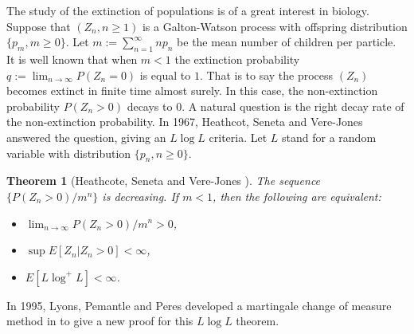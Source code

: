 \documentclass[12pt,a4paper]{amsart}
\numberwithin{equation}{section}
\theoremstyle{plain}
\newtheorem{thm}{Theorem}[section]
\theoremstyle{definition}
\theoremstyle{remark}
\begin{document}
The study of the extinction of populations is of a great interest in biology. Suppose that $(Z_n, n\ge 1)$ is a Galton-Watson process with offspring distribution $\{p_m, m\ge 0\}$.
Let $m:=\sum^{\infty}_{n=1}np_n$ be the mean number of
children per particle. It is well known that when $m<1$ the extinction probability $q:=\lim_{n\rightarrow\infty}P\left(Z_n=0\right)$ is equal to
$1$. That is to say the process $(Z_n)$ becomes extinct in finite time almost surely. In this case, the non-extinction probability $P(Z_n>0)$ decays to $0$.  A natural question is  the right decay rate of the non-extinction probability. In 1967, Heathcot, Seneta and Vere-Jones \cite{HeathcoteSenetaVere-Jones1967A-refinement} answered the question, giving an $L\log L$ criteria. Let $L$ stand for a random variable with distribution $\{p_n, n\ge 0\}$.

\begin{thm}[Heathcote, Seneta and Vere-Jones \cite{HeathcoteSenetaVere-Jones1967A-refinement}]
The sequence $\{ P(Z_n>0)/m^n\}$ is decreasing. If $m<1$, then the following are equivalent:
\begin{itemize}
\item[$(i)$] $\lim_{n\rightarrow\infty}P(Z_n>0)/m^n>0$,
\item[$(ii)$] $\sup E[Z_n|Z_n>0]<\infty$,
\item[$(iii)$] $E\left[L\log^+ L\right]<\infty$.
\end{itemize}
\end{thm}
In 1995, Lyons, Pemantle and Peres developed a martingale change of measure method in \cite{LyonsPemantlePeres1995Conceptual} to give a new proof for this $L\log L$ theorem.
\end{document}
